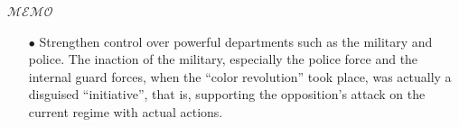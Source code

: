 \documentclass[12pt]{article}  %
\begin{document}
\begin{letter}{\huge{$\mathscr{MEMO}$}}
{\begin{enumerate}[0]
	\item[$\bullet$] Strengthen control over powerful departments such as the military and police. The inaction of the military, especially the police force and the internal guard forces, when the ``color revolution'' took place, was actually a disguised ``initiative'', that is, supporting the opposition's attack on the current regime with actual actions.
\end{enumerate}}
\end{letter}
\end{document}
